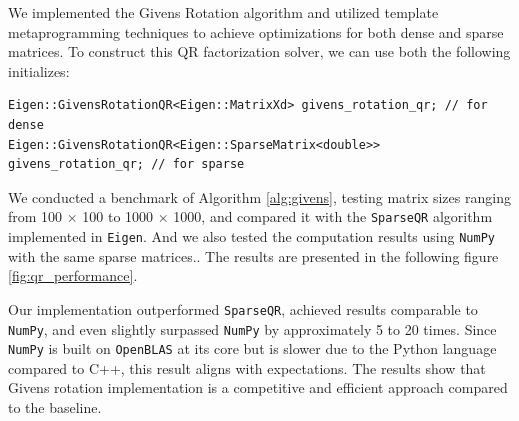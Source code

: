 \documentclass[11pt,a4paper]{article}
\begin{document}
We implemented the Givens Rotation algorithm and utilized template metaprogramming techniques to achieve optimizations for both dense and sparse matrices. To construct this QR factorization solver, we can use both the following initializes:
\begin{verbatim}
Eigen::GivensRotationQR<Eigen::MatrixXd> givens_rotation_qr; // for dense
Eigen::GivensRotationQR<Eigen::SparseMatrix<double>> givens_rotation_qr; // for sparse
\end{verbatim}
We conducted a benchmark of Algorithm \ref{alg:givens}, testing matrix sizes ranging from 100 $\times$ 100 to 1000 $\times$ 1000, and compared it with the \texttt{SparseQR} algorithm implemented in \texttt{Eigen}. And we also tested the computation results using \texttt{NumPy} with the same sparse matrices.. The results are presented in the following figure \ref{fig:qr_performance}.

Our implementation outperformed \texttt{SparseQR}, achieved results comparable to \texttt{NumPy}, and even slightly surpassed \texttt{NumPy} by approximately 5 to 20 times. Since \texttt{NumPy} is built on \texttt{OpenBLAS} at its core but is slower due to the Python language compared to C++, this result aligns with expectations. The results show that Givens rotation implementation is a competitive and efficient approach compared to the baseline.
\end{document}

